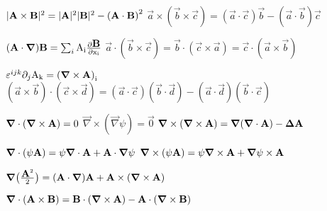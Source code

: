 \begin{squishlist}

\item $|\vec{\rm{A}} \times \vec{\rm{B}}|^2 = |\vec{\rm{A}}|^2|\vec{\rm{B}}|^2 - \left(\vec{\rm{A}}\cdot\vec{\rm{B}}\right)^2 $ \squishsep $\vec{a} \times (\vec{b} \times \vec{c}) = (\vec{a} \cdot \vec{c})\vec{b} - (\vec{a} \cdot \vec{b})\vec{c}$


\item $(\vec{\rm{A}} \cdot \vec \nabla)\vec{\rm{B}} = \sum_{i} \rm{A}_i\frac{\partial \vec{\rm{B}}}{\partial x_i}$ \squishsep $\vec{a}\cdot(\vec{b}\times\vec{c})=\vec{b}\cdot(\vec{c}\times\vec{a})=\vec{c}\cdot(\vec{a}\times\vec{b})$

\item $\varepsilon^{ijk}\partial_j\rm{A}_k = \left(\vec{\nabla} \times \vec{\rm{A}} \right)_i$ \squishsep $(\vec{a} \times \vec{b}) \cdot (\vec{c} \times \vec{d}) = (\vec{a}\cdot\vec{c})(\vec{b}\cdot\vec{d}) - (\vec{a}\cdot\vec{d})(\vec{b}\cdot\vec{c})$


\item $\vec{\nabla}\cdot (\vec{\nabla}\times\vec{\rm{A}})=0$ \squishsep $\vec{\nabla} \times (\vec{\nabla}\psi)=\vec{0}$ \squishsep $\vec{\nabla} \times (\vec{\nabla} \times \vec{\rm{A}}) = \vec{\nabla} (\vec{\nabla} \cdot \vec{\rm{A}}) - \vec \Delta \vec{\rm{A}}$

\item $\vec{\nabla} \cdot (\psi\vec{\rm{A}}) = \psi\vec{\nabla}\cdot\vec{\rm{A}} + \vec{\rm{A}}\cdot\vec{\nabla}\psi$ \squishsep $\vec{\nabla} \times (\psi\vec{\rm{A}}) = \psi \vec{\nabla} \times \vec{\rm{A}} + \vec{\nabla}\psi \times \vec{\rm{A}}$

\item $\vec \nabla \big( \frac{\vec{\rm{A}}^2}{2} \big) = (\vec{\rm{A}} \cdot \vec \nabla)\vec{\rm{A}} + \vec{\rm{A}} \times (\vec \nabla \times \vec{\rm{A}})$

\item $\vec \nabla \cdot (\vec{\rm{A}} \times \vec{\rm{B}}) = \vec{\rm{B}} \cdot (\vec \nabla \times \vec{\rm{A}}) - \vec{\rm{A}} \cdot (\vec \nabla \times \vec{\rm{B}})$


\end{squishlist}
